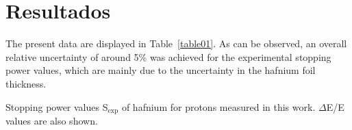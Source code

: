 \section{Resultados}
\label{discussion}

The present data are displayed in Table~\ref{table01}. As can be observed, 
an overall relative uncertainty of around 5\% was achieved for the experimental 
stopping power values, which are mainly due to the uncertainty in the hafnium foil 
thickness. 

\begin{table*}[!t]
\centering
\caption{Stopping power values S$_{\mathrm{exp}}$ of hafnium for protons 
measured in this work. $\Delta$E/E values are also shown.}
\label{table01}

\vspace{0.2cm}


\end{table*}
